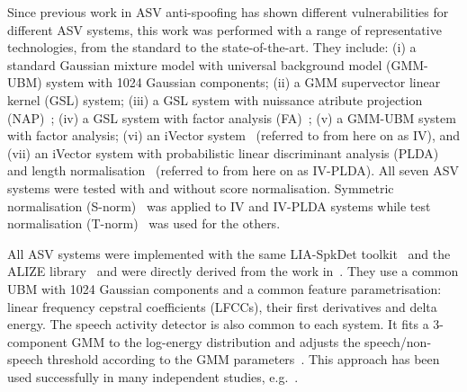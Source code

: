 
Since previous work in ASV anti-spoofing has shown different vulnerabilities for different ASV systems, this work was performed with a range of representative technologies, from the standard to the state-of-the-art.
They include: (i) a standard Gaussian mixture model with universal background model (GMM-UBM) system with 1024 Gaussian components;
(ii) a GMM supervector linear kernel (GSL) system;
(iii) a GSL system with nuissance atribute projection (NAP)~\cite{Campbell2006};
(iv) a GSL system with factor analysis (FA)~\cite{Fauve2007};
(v) a GMM-UBM system with factor analysis;
(vi) an iVector system~\cite{Dehak2011} (referred to from here on as IV), and 
(vii) an iVector system  with probabilistic linear discriminant analysis (PLDA)~\cite{Li2012} and length normalisation~\cite{Garcia2011} (referred to from here on as IV-PLDA). 
All seven ASV systems were tested with and without score normalisation.  
Symmetric normalisation (S-norm)~\cite{Kenny2010} was applied to IV and IV-PLDA systems while test normalisation (T-norm)~\cite{Auckenthaler2000} was used for the others.

All ASV systems were implemented with the same LIA-SpkDet toolkit~\cite{Bonastre2008} and the ALIZE library~\cite{Bonastre2004} and were directly derived from the work in~\cite{Fauve2007}.
They use a common UBM with 1024 Gaussian components and a common feature parametrisation: linear frequency cepstral coefficients (LFCCs), their first derivatives and delta energy. 
The speech activity detector is also common to each system.  
It fits a 3-component GMM to the log-energy distribution and adjusts the speech/non-speech threshold according to the GMM parameters~\cite{Bimbot2004}.
This approach has been used successfully in many independent studies, e.g.~\cite{magrin2001,fauve2008}. 